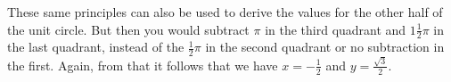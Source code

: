 \documentclass[preview]{standalone}
\begin{document}
\begin{center}
These same principles can also be used to derive the values for the other half of the unit circle. But then you would subtract $\pi$ in the third quadrant and $1 \frac{1}{2} \pi$ in the last quadrant, instead of the $\frac{1}{2} \pi$ in the second quadrant or no subtraction in the first. Again, from that it follows that we have $x= - \frac{1}{2}$ and $y=\frac{\sqrt{3}}{2}$.
\end{center}
\end{document}
